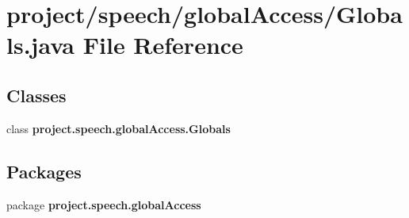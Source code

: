 \section{project/speech/global\+Access/\+Globals.java File Reference}
\label{_globals_8java}
\subsection*{Classes}
\begin{DoxyCompactItemize}
\item 
class {\bf project.\+speech.\+global\+Access.\+Globals}
\end{DoxyCompactItemize}
\subsection*{Packages}
\begin{DoxyCompactItemize}
\item 
package {\bf project.\+speech.\+global\+Access}
\end{DoxyCompactItemize}
